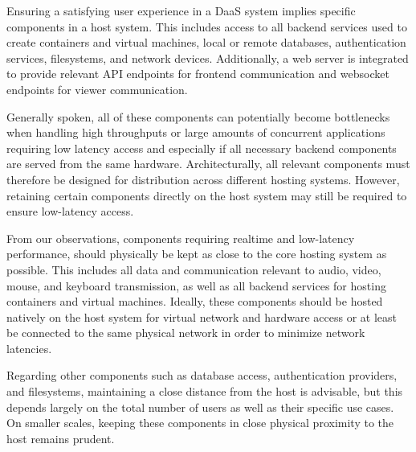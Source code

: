 \documentclass[runningheads]{llncs}
\begin{document}
Ensuring a satisfying user experience in a DaaS system
implies specific components in a host system.
This includes access to all backend services
used to create containers and virtual machines,
local or remote databases, authentication services, filesystems, and network devices.
Additionally, a web server is integrated to provide relevant API endpoints
for frontend communication and websocket endpoints for viewer communication.

Generally spoken, all of these components can potentially become bottlenecks
when handling high throughputs or large amounts of concurrent applications
requiring low latency access and especially if all necessary backend components
are served from the same hardware.
Architecturally, all relevant components
must therefore be designed for distribution across different hosting systems.
However, retaining certain components directly on the host system
may still be required to ensure low-latency access.


From our observations, components requiring realtime and low-latency performance,
should physically be kept as close to the core hosting system as possible.
This includes all data and communication relevant to
audio, video, mouse, and keyboard transmission,
as well as all backend services for hosting containers and virtual machines.
Ideally, these components should be hosted natively on the host system
for virtual network and hardware access
or at least be connected to the same physical network
in order to minimize network latencies.

Regarding other components such as database access,
authentication providers, and filesystems,
maintaining a close distance from the host is advisable,
but this depends largely on the total number of users
as well as their specific use cases.
On smaller scales, keeping these components
in close physical proximity to the host remains prudent.
\end{document}
